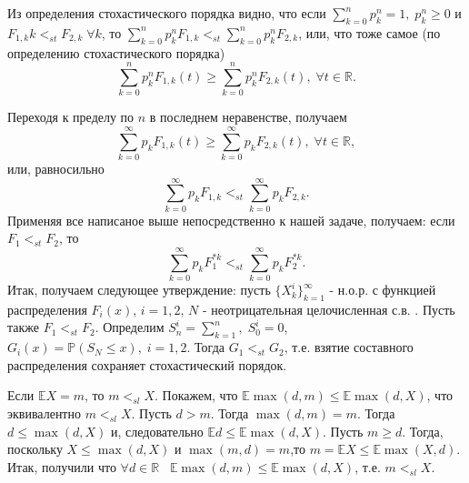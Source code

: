         Из определения стохастического порядка видно, что если $\sum_{k=0}^n p^n_k = 1,\; p^n_k\geqslant0$ и $F_{1,k}k <_{st} F_{2,k} \; \forall k$, то $\sum_{k=0}^np^n_kF_{1,k} <_{st} \sum_{k=0}^np^n_kF_{2,k} $, или, что тоже самое (по определению стохастического порядка) 
        \begin{equation}
            \sum_{k=0}^np^n_kF_{1,k}(t) \geq \sum_{k=0}^np^n_kF_{2,k}(t),\; \forall t\in \mathbb R.
        \end{equation}
        
        Переходя к пределу по $n$ в последнем неравенстве, получаем 
        \begin{equation*}
            \sum_{k=0}^\infty p_kF_{1,k}(t) \geq \sum_{k=0}^\infty p_kF_{2,k}(t),\; \forall t\in \mathbb R,
        \end{equation*}
        или, равносильно
        \begin{equation*}
            \sum_{k=0}^\infty p_kF_{1,k} <_{st} \sum_{k=0}^\infty p_kF_{2,k}.
        \end{equation*}
        Применяя все написаное выше непосредственно к нашей задаче, получаем: если $F_1 <_{st} F_2$, то
        \begin{equation*}
            \sum_{k=0}^\infty p_kF_1^{*k} <_{st} \sum_{k=0}^\infty p_kF_2^{*k}.
        \end{equation*}
        Итак, получаем следующее утверждение: пусть $\{X_k^i\}_{k=1}^\infty$ - н.о.р. с функцией распределения $F_i(x)$, $i=1,2$, $N$ - неотрицательная целочисленная с.в. . Пусть также $F_1 <_{st}F_2$. Определим $S^i_n=\sum_{k=1}^n ,\; S_0^i = 0$, $G_i(x) = \mathbb P(S_N \leq x) ,\; i=1,2 $. Тогда $G_1 <_{st} G_2$, т.е. взятие составного распределения сохраняет стохастический порядок. 
        
    \problem{}
        Если $\mathbb EX = m$, то $m<_{sl} X$.
        \solution{}
            Покажем, что $\mathbb E \max(d,m) \leq \mathbb E \max(d, X)$, что эквивалентно $m<_{sl}X$. Пусть $d>m$. Тогда $\max(d,m) = m$. Тогда $d\leq \max(d, X)$ и, следовательно $\mathbb Ed \leq \mathbb E\max(d,X)$. Пусть $m\geq d$. Тогда, поскольку $X\leq \max(d,X)$ и $\max(m,d) = m$,то $ m=\mathbb EX\leq \mathbb E \max(X,d)$. Итак, получили что $\forall d \in \mathbb R \;\;\; \mathbb E \max(d,m) \leq \mathbb E \max(d,X)$, т.е. $m<_{sl}X$.
            
